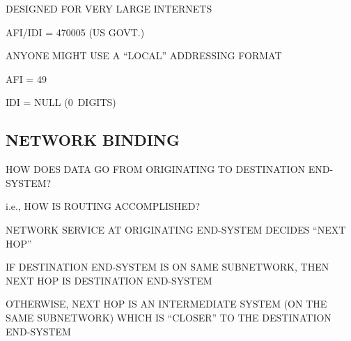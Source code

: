 \begin{bwslide}

\begin{nrtc}
\item	DESIGNED FOR VERY LARGE INTERNETS
    \begin{nrtc}
    \item	AFI/IDI = 470005 (US GOVT.)
    \end{nrtc}
\end{nrtc}

\end{bwslide}


\begin{bwslide}

\begin{nrtc}
\item	ANYONE MIGHT USE A ``LOCAL'' ADDRESSING FORMAT
    \begin{nrtc}
    \item	AFI = 49

    \item	IDI = NULL (0~DIGITS)
    \end{nrtc}
\end{nrtc}

\end{bwslide}


\begin{bwslide}
\part*	{NETWORK BINDING}\bf

\begin{nrtc}
\item	HOW DOES DATA GO FROM ORIGINATING TO DESTINATION END-SYSTEM?
    \begin{nrtc}
    \item	i.e., HOW IS ROUTING ACCOMPLISHED?
    \end{nrtc}

\item	NETWORK SERVICE AT ORIGINATING END-SYSTEM DECIDES ``NEXT HOP''

\item	IF DESTINATION END-SYSTEM IS ON SAME SUBNETWORK,
	THEN NEXT HOP IS DESTINATION END-SYSTEM

\item	OTHERWISE, NEXT HOP IS AN INTERMEDIATE SYSTEM (ON THE SAME SUBNETWORK)
	WHICH IS ``CLOSER'' TO THE DESTINATION END-SYSTEM
\end{nrtc}
\end{bwslide}


